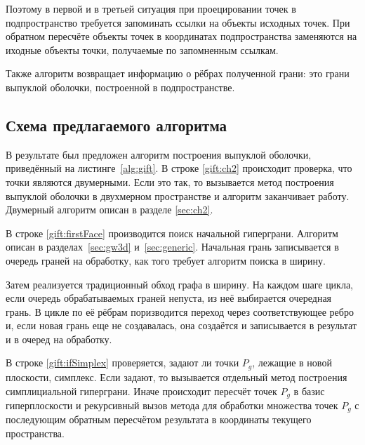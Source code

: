 \documentclass[14pt]{extarticle}
\begin{document}
Поэтому в первой и в третьей ситуация при проецировании точек в подпространство требуется запоминать ссылки на объекты исходных точек. При обратном пересчёте объекты точек в координатах подпространства заменяются на иходные объекты точки, получаемые по запомненным ссылкам.

Также алгоритм возвращает информацию о рёбрах полученной грани: это грани выпуклой оболочки, построенной в подпространстве.


\subsection{Схема предлагаемого алгоритма}

В результате был предложен алгоритм построения выпуклой оболочки, приведённый на листинге~\ref{alg:gift}. В строке \ref{gift:ch2} происходит проверка, что точки являются двумерными. Если это так, то вызывается метод построения выпуклой оболочки в двухмерном пространстве и алгоритм заканчивает работу. Двумерный алгоритм описан в разделе \ref{sec:ch2}.

В строке \ref{gift:firstFace} производится поиск начальной гиперграни. Алгоритм описан в разделах~\ref{sec:gw3d} и~\ref{sec:generic}. Начальная грань записывается в очередь граней на обработку, как того требует алгоритм поиска в ширину.

Затем реализуется традиционный обход графа в ширину. На каждом шаге цикла, если очередь обрабатываемых граней непуста, из неё выбирается очередная грань. В цикле по её рёбрам поризводится переход через соответствующее ребро и, если новая грань еще не создавалась, она создаётся и записывается в результат и в очеред на обработку.

В строке \ref{gift:ifSimplex} проверяется, задают ли точки $P_g$, лежащие в новой плоскости, симплекс. Если задают, то вызывается отдельный метод построения симплициальной гиперграни. Иначе происходит пересчёт точек $P_g$ в базис гиперплоскости и рекурсивный вызов метода для обработки множества точек $P_g$ с последующим обратным пересчётом результата в координаты текущего пространства.
\end{document}
